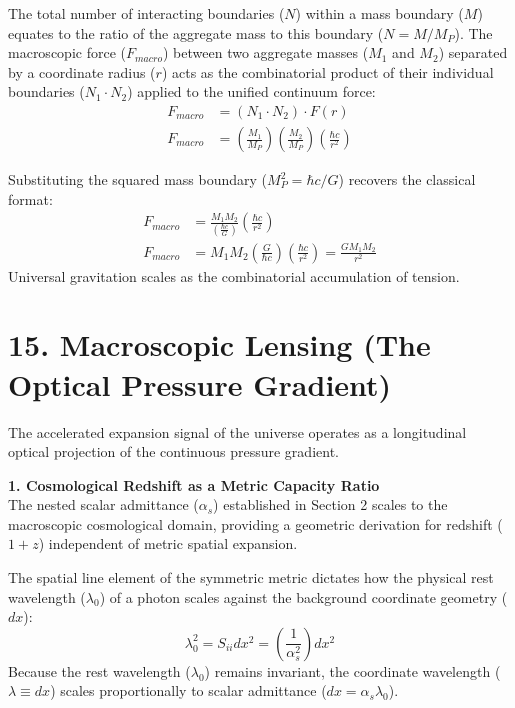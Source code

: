The total number of interacting boundaries ($N$) within a mass boundary ($M$) equates to the ratio of the aggregate mass to this boundary ($N = M / M_P$). The macroscopic force ($F_{macro}$) between two aggregate masses ($M_1$ and $M_2$) separated by a coordinate radius ($r$) acts as the combinatorial product of their individual boundaries ($N_1 \cdot N_2$) applied to the unified continuum force:
\begin{align}
    F_{macro} &= (N_1 \cdot N_2) \cdot F(r) \nonumber \\
    F_{macro} &= \left( \frac{M_1}{M_P} \right) \left( \frac{M_2}{M_P} \right) \left( \frac{\hbar c}{r^2} \right)
\end{align}


Substituting the squared mass boundary ($M_P^2 = \hbar c / G$) recovers the classical format:
\begin{align}
    F_{macro} &= \frac{M_1 M_2}{\left( \frac{\hbar c}{G} \right)} \left( \frac{\hbar c}{r^2} \right) \nonumber \\
    F_{macro} &= M_1 M_2 \left( \frac{G}{\hbar c} \right) \left( \frac{\hbar c}{r^2} \right) = \frac{G M_1 M_2}{r^2}
\end{align}
Universal gravitation scales as the combinatorial accumulation of tension.



\section*{15. Macroscopic Lensing (The Optical Pressure Gradient)}

The accelerated expansion signal of the universe operates as a longitudinal optical projection of the continuous pressure gradient.

\textbf{1. Cosmological Redshift as a Metric Capacity Ratio} \\ 
The nested scalar admittance ($\alpha_s$) established in Section 2 scales to the macroscopic cosmological domain, providing a geometric derivation for redshift ($1+z$) independent of metric spatial expansion. 

The spatial line element of the symmetric metric dictates how the physical rest wavelength ($\lambda_0$) of a photon scales against the background coordinate geometry ($dx$):
\begin{equation}
    \lambda_0^2 = S_{ii} dx^2 = \left( \frac{1}{\alpha_s^2} \right) dx^2
\end{equation}
Because the rest wavelength ($\lambda_0$) remains invariant, the coordinate wavelength ($\lambda \equiv dx$) scales proportionally to scalar admittance ($dx = \alpha_s \lambda_0$). 

